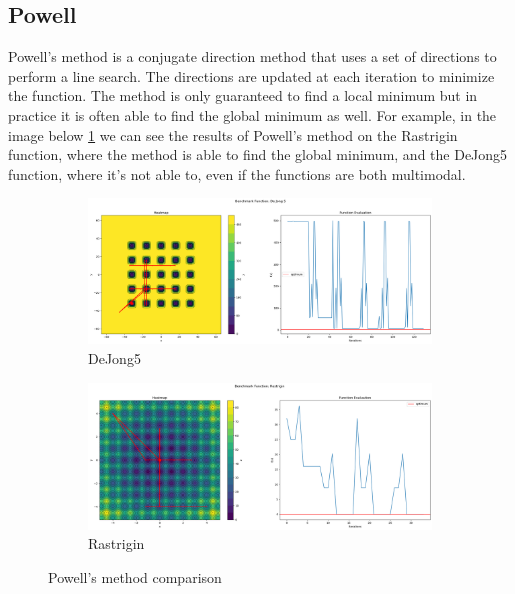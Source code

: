 \subsection{Powell}
\label{sec:powell}
Powell's method is a conjugate direction method that uses a set of directions to perform a line search. The directions are updated at each iteration to minimize the function. The method is only guaranteed to find a local minimum but in practice it is often able to find the global minimum as well. For example, in the image below \ref{fig:pw} we can see the results of Powell's method on the Rastrigin function, where the method is able to find the global minimum, and the DeJong5 function, where it's not able to, even if the functions are both multimodal.

\begin{figure}[H]
    \begin{subfigure}{0.5\textwidth}
        \includegraphics[width=\textwidth]{lab1/imgs/pw_dejong.png}
        \caption{DeJong5}
    \end{subfigure}
    \begin{subfigure}{0.5\textwidth}
        \includegraphics[width=\textwidth]{lab1/imgs/pw_rastrigin.png}
        \caption{Rastrigin}
    \end{subfigure}
    \caption{Powell's method comparison}
    \label{fig:pw}
\end{figure}

